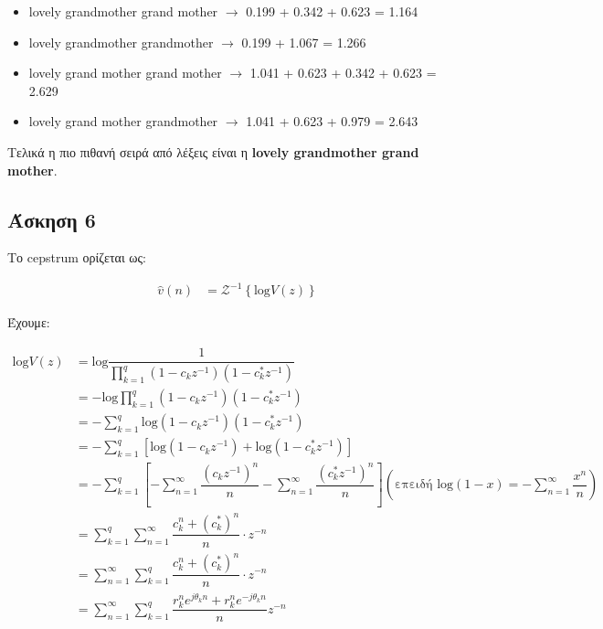 \documentclass[12pt,a4paper]{article}
\begin{document}
			\begin{itemize}
				\item lovely grandmother grand mother $\rightarrow$ 0.199 + 0.342 + 0.623 = 1.164
				\item lovely grandmother grandmother $\rightarrow$ 0.199 + 1.067 = 1.266
				\item lovely grand mother grand mother $\rightarrow$ 1.041 + 0.623 + 0.342 + 0.623 = 2.629
				\item lovely grand mother grandmother $\rightarrow$ 1.041 + 0.623 + 0.979 = 2.643
			\end{itemize}
			
			Τελικά η πιο πιθανή σειρά από λέξεις είναι η \textbf{lovely grandmother grand mother}.
			
	\subsection*{Άσκηση 6}
		Το cepstrum ορίζεται ως:
		
		\begin{align*}
			\hat v(n) &= \mathcal{Z}^{-1} \left\{ \text{log} V(z) \right\} 
		\end{align*}
		
		Έχουμε:
		
		\begin{align*}
			\text{log} V(z) &= \text{log} \dfrac{1}{\prod_{k=1}^{q} (1-c_kz^{-1})(1-c_k^*z^{-1})} \\
			&= -\text{log} \prod_{k=1}^{q} (1-c_kz^{-1})(1-c_k^*z^{-1}) \\
			&= -\sum_{k=1}^{q} \text{log} (1-c_kz^{-1})(1-c_k^*z^{-1}) \\
			&= -\sum_{k=1}^{q} \left[ \text{log} (1-c_kz^{-1}) + \text{log} (1-c_k^*z^{-1}) \right] \\
			&= -\sum_{k=1}^{q} \left[ -\sum_{n=1}^{\infty} \dfrac{\left(c_kz^{-1}\right)^n}{n} -\sum_{n=1}^{\infty} \dfrac{\left(c_k^*z^{-1}\right)^n}{n} \right] \left(\text{επειδή } \text{log} (1-x) = -\sum_{n=1}^{\infty} \dfrac{x^n}{n}\right) \\
			&= \sum_{k=1}^{q} \sum_{n=1}^{\infty} \dfrac{c_k^n+\left(c_k^*\right)^n}{n} \cdot z^{-n} \\
			&= \sum_{n=1}^{\infty} \sum_{k=1}^{q} \dfrac{c_k^n+\left(c_k^*\right)^n}{n} \cdot z^{-n} \\
			&= \sum_{n=1}^{\infty} \sum_{k=1}^{q} \dfrac{r_k^ne^{j\theta_kn}+r_k^ne^{-j\theta_kn}}{n}z^{-n} \\
		\end{align*}
		
\end{document}
